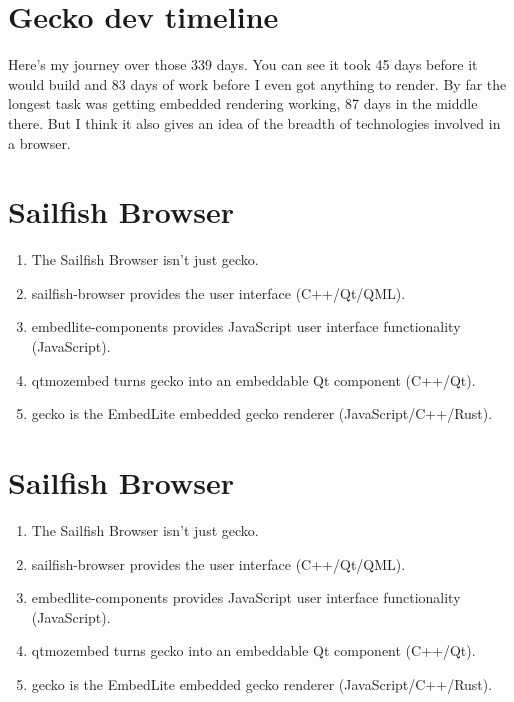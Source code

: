 \documentclass{article}
\begin{document}
\section{Gecko dev timeline}

Here's my journey over those 339 days. You can see it took 45 days before it would build and 83 days of work before I even got anything to render. By far the longest task was getting embedded rendering working, 87 days in the middle there. But I think it also gives an idea of the breadth of technologies involved in a browser.


\section{Sailfish Browser}

\begin{enumerate}
\item The Sailfish Browser isn't just gecko.
\item {\code sailfish-browser} provides the user interface (C++/Qt/QML).
\item {\code embedlite-components} provides JavaScript user interface functionality (JavaScript).
\item {\code qtmozembed} turns gecko into an embeddable Qt component (C++/Qt).
\item {\code gecko} is the EmbedLite embedded gecko renderer (JavaScript/C++/Rust).
\end{enumerate}


\section{Sailfish Browser}

\begin{enumerate}
\item The Sailfish Browser isn't just gecko.
\item {\code sailfish-browser} provides the user interface (C++/Qt/QML).
\item {\code embedlite-components} provides JavaScript user interface functionality (JavaScript).
\item {\code qtmozembed} turns gecko into an embeddable Qt component (C++/Qt).
\item {\code gecko} is the EmbedLite embedded gecko renderer (JavaScript/C++/Rust).
\end{enumerate}
\end{document}
